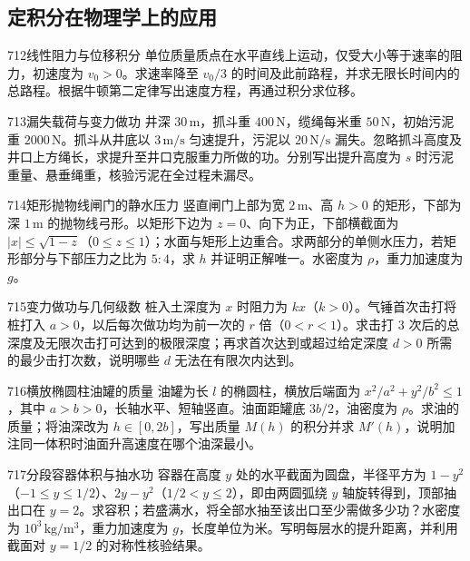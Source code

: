 \subsection{定积分在物理学上的应用}
\begin{exercise}{712}{线性阻力与位移积分}
单位质量质点在水平直线上运动，仅受大小等于速率的阻力，初速度为 $v_0>0$。求速率降至 $v_0/3$ 的时间及此前路程，并求无限长时间内的总路程。根据牛顿第二定律写出速度方程，再通过积分求位移。
\end{exercise}
\begin{exercise}{713}{漏失载荷与变力做功}
井深 $30\,\mathrm m$，抓斗重 $400\,\mathrm N$，缆绳每米重 $50\,\mathrm N$，初始污泥重 $2000\,\mathrm N$。抓斗从井底以 $3\,\mathrm{m/s}$ 匀速提升，污泥以 $20\,\mathrm{N/s}$ 漏失。忽略抓斗高度及井口上方绳长，求提升至井口克服重力所做的功。分别写出提升高度为 $s$ 时污泥重量、悬垂绳重，核验污泥在全过程未漏尽。
\end{exercise}
\begin{exercise}{714}{矩形抛物线闸门的静水压力}
竖直闸门上部为宽 $2\,\mathrm m$、高 $h>0$ 的矩形，下部为深 $1\,\mathrm m$ 的抛物线弓形。以矩形下边为 $z=0$、向下为正，下部横截面为 $|x|\le\sqrt{1-z}$（$0\le z\le1$）；水面与矩形上边重合。求两部分的单侧水压力，若矩形部分与下部压力之比为 $5:4$，求 $h$ 并证明正解唯一。水密度为 $\rho$，重力加速度为 $g$。
\end{exercise}
\begin{exercise}{715}{变力做功与几何级数}
桩入土深度为 $x$ 时阻力为 $kx$（$k>0$）。气锤首次击打将桩打入 $a>0$，以后每次做功均为前一次的 $r$ 倍（$0<r<1$）。求击打 $3$ 次后的总深度及无限次击打可达到的极限深度；再求首次达到或超过给定深度 $d>0$ 所需的最少击打次数，说明哪些 $d$ 无法在有限次内达到。
\end{exercise}
\begin{exercise}{716}{横放椭圆柱油罐的质量}
油罐为长 $l$ 的椭圆柱，横放后端面为 $x^2/a^2+y^2/b^2\le1$，其中 $a>b>0$，长轴水平、短轴竖直。油面距罐底 $3b/2$，油密度为 $\rho$。求油的质量；将油深改为 $h\in[0,2b]$，写出质量 $M(h)$ 的积分并求 $M'(h)$，说明加注同一体积时油面升高速度在哪个油深最小。
\end{exercise}
\begin{exercise}{717}{分段容器体积与抽水功}
容器在高度 $y$ 处的水平截面为圆盘，半径平方为 $1-y^2$（$-1\le y\le1/2$）、$2y-y^2$（$1/2<y\le2$），即由两圆弧绕 $y$ 轴旋转得到，顶部抽出口在 $y=2$。求容积；若盛满水，将全部水抽至该出口至少需做多少功？水密度为 $10^3\,\mathrm{kg/m^3}$，重力加速度为 $g$，长度单位为米。写明每层水的提升距离，并利用截面对 $y=1/2$ 的对称性核验结果。
\end{exercise}
